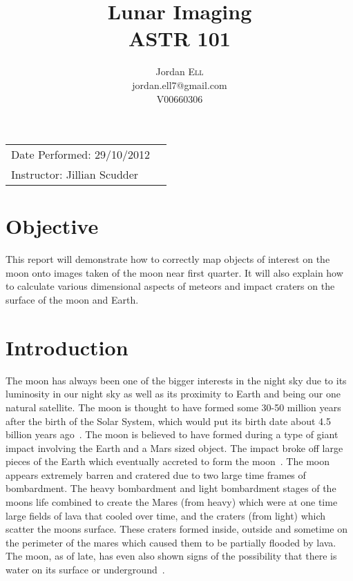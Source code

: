 \documentclass{article}
\title{Lunar Imaging \\ ASTR 101} %
\author{Jordan \textsc{Ell} \\ jordan.ell7@gmail.com \\ V00660306} %
\begin{document}
\maketitle %

\begin{tabular}{lr}
Date Performed: 29/10/2012\\ %
Instructor: Jillian Scudder %
\end{tabular}

\setlength\parindent{0pt} %

\renewcommand{\labelenumi}{\alph{enumi}.} %


\section{Objective}

This report will demonstrate how to correctly map objects of interest on the moon onto images taken of the moon near first quarter. It will
also explain how to calculate various dimensional aspects of meteors and impact craters on the surface of the moon and Earth.
 

\section{Introduction}

The moon has always been one of the bigger interests in the night sky due to its luminosity in our night sky as well as its
proximity to Earth and being our one natural satellite. The moon is thought to have formed some 30-50 million years after
the birth of the Solar System, which would put its birth date about 4.5 billion years ago~\cite{Kleine:2005}. The moon is
believed to have formed during a type of giant impact involving the Earth and a Mars sized object. The impact broke
off large pieces of the Earth which eventually accreted to form the moon~\cite{Taylor:1998}. The moon appears extremely
barren and cratered due to two large time frames of bombardment.  The heavy bombardment and light bombardment stages of
the moons life combined to create the Mares (from heavy) which were at one time large fields of lava that cooled over time,
and the craters (from light) which scatter the moons surface. These craters formed inside, outside and sometime on the perimeter
of the mares which caused them to be partially flooded by lava. The moon, as of late, has even also shown signs of the possibility
that there is water on its surface or underground~\cite{Margot:1999}.\\
\end{document}
